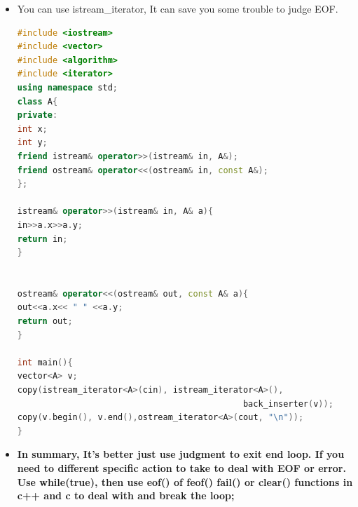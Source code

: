 \documentclass[a4paper,12pt,twoside]{book}
\begin{document}
\begin{itemize}
\begin{lstlisting}[frame=single, language=c++]
while(!issapce(cin.get()))
            continue;  //method 2

basic_istream& ignore(streamsize _Count = 1, \
int_type _Delim = traits_type::eof());  //method 3
cin.ignore(5, 'a');
cin.ignore(numeric_limits<streamsize>::max(), '\n');
\end{lstlisting}

\item You can use istream\_iterator, It can save you some trouble to judge EOF.

\begin{lstlisting}[frame=single, language=c++]
#include <iostream>
#include <vector>
#include <algorithm>
#include <iterator>
using namespace std;
class A{
private:
int x;
int y;
friend istream& operator>>(istream& in, A&);
friend ostream& operator<<(ostream& in, const A&);
};

istream& operator>>(istream& in, A& a){
in>>a.x>>a.y;
return in;
}


ostream& operator<<(ostream& out, const A& a){
out<<a.x<< " " <<a.y;
return out;
}

int main(){
vector<A> v;
copy(istream_iterator<A>(cin), istream_iterator<A>(),
                                             back_inserter(v));
copy(v.begin(), v.end(),ostream_iterator<A>(cout, "\n"));
}

\end{lstlisting}


\item \textbf{In summary, It's better just use judgment to exit end loop.  If you need to different specific action to take to deal with EOF or error. Use while(true), then use eof() of feof() fail() or clear() functions in c++ and c to deal with and break the loop; }

\end{itemize}
\end{document}
